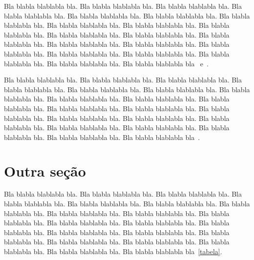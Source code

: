 \documentclass[diss,capa]{texufpel}
\begin{document}
Bla blabla blablabla bla.  Bla blabla blablabla bla.  Bla blabla
blablabla bla.  Bla blabla blablabla bla.  Bla blabla blablabla bla.
Bla blabla blablabla bla.  Bla blabla blablabla bla.  Bla blabla
blablabla bla.  Bla blabla blablabla bla.  Bla blabla blablabla bla.
Bla blabla blablabla bla.  Bla blabla blablabla bla.  Bla blabla
blablabla bla.  Bla blabla blablabla bla.  Bla blabla blablabla bla.
Bla blabla blablabla bla.  Bla blabla blablabla bla.  Bla blabla
blablabla bla.  Bla blabla blablabla bla.  Bla blabla blablabla bla.
Bla blabla blablabla bla~\citet{Moore:1979:MAI,Aguiar:2005} e~\cite{Aguiar:2005}.

Bla blabla blablabla bla.  Bla blabla blablabla bla.  Bla blabla
blablabla bla.  Bla blabla blablabla bla.  Bla blabla blablabla bla.
Bla blabla blablabla bla.  Bla blabla blablabla bla.  Bla blabla
blablabla bla.  Bla blabla blablabla bla.  Bla blabla blablabla bla.
Bla blabla blablabla bla.  Bla blabla blablabla bla.  Bla blabla
blablabla bla.  Bla blabla blablabla bla.  Bla blabla blablabla bla.
Bla blabla blablabla bla.  Bla blabla blablabla bla.  Bla blabla
blablabla bla.  Bla blabla blablabla bla.  Bla blabla blablabla bla.
Bla blabla blablabla bla~\cite{vonNeumann:1966:TSR}.

\section{Outra seção}

Bla blabla blablabla bla.  Bla blabla blablabla bla.  Bla blabla
blablabla bla.  Bla blabla blablabla bla.  Bla blabla blablabla bla.
Bla blabla blablabla bla.  Bla blabla blablabla bla.  Bla blabla
blablabla bla.  Bla blabla blablabla bla.  Bla blabla blablabla bla.
Bla blabla blablabla bla.  Bla blabla blablabla bla.  Bla blabla
blablabla bla.  Bla blabla blablabla bla.  Bla blabla blablabla bla.
Bla blabla blablabla bla.  Bla blabla blablabla bla.  Bla blabla
blablabla bla.  Bla blabla blablabla bla.  Bla blabla blablabla bla.
Bla blabla blablabla bla~\ref{tabela}.
\end{document}
